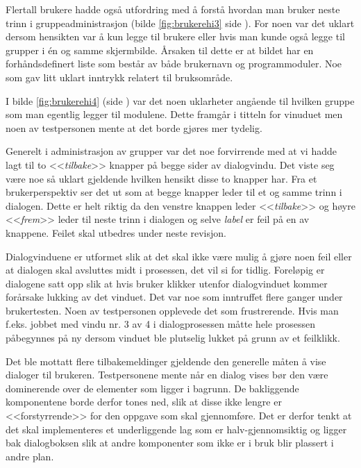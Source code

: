 Flertall brukere hadde også utfordring med å forstå hvordan man bruker neste trinn i gruppeadministrasjon (bilde \ref{fig:brukerehi3} side \pageref{fig:brukerehi3}). 
For noen var det uklart dersom hensikten var å kun legge til brukere eller hvis man kunde også legge til grupper i én og samme skjermbilde.
Årsaken til dette er at bildet har en forhåndsdefinert liste som består av både brukernavn og programmoduler. Noe som gav litt uklart inntrykk relatert til bruksområde.

I bilde \ref{fig:brukerehi4} (side \pageref{fig:brukerehi4}) var det noen uklarheter angående til hvilken gruppe som man egentlig legger til modulene. Dette framgår i titteln for vinuduet men noen av testpersonen mente at det borde gjøres mer tydelig. 

Generelt i administrasjon av grupper var det noe forvirrende med at vi hadde lagt til to <<\textit{tilbake}>> knapper på begge sider av dialogvindu. Det viste seg være noe så uklart gjeldende hvilken hensikt disse to knapper har. Fra et brukerperspektiv ser det ut som at begge knapper leder til et og samme trinn i dialogen. 
Dette er helt riktig da den venstre knappen leder <<\textit{tilbake}>> og høyre <<\textit{frem}>> leder til neste trinn i dialogen og selve \textit{label} er feil på en av knappene. Feilet skal utbedres under neste revisjon.

Dialogvinduene er utformet slik at det skal ikke være mulig å gjøre noen feil eller at dialogen skal avsluttes midt i prosessen, det vil si for tidlig.
Foreløpig er dialogene satt opp slik at hvis bruker klikker utenfor dialogvinduet kommer forårsake lukking av det vinduet. 
Det var noe som inntruffet flere ganger under brukertesten. 
Noen av testpersonen opplevede det som frustrerende. Hvis man f.eks. jobbet med vindu nr. 3 av 4 i dialogprosessen måtte hele prosessen påbegynnes på ny dersom vinduet ble plutselig lukket på grunn av et feilklikk. 

Det ble mottatt flere tilbakemeldinger gjeldende den generelle måten å vise dialoger til brukeren. Testpersonene mente når en dialog vises bør den være dominerende over de elementer som ligger i bagrunn.  
De bakliggende komponentene borde derfor tones ned, slik at disse ikke lengre er <<forstyrrende>> for den oppgave som skal gjennomføre.
Det er derfor tenkt at det skal implementeres et underliggende lag som er halv-gjennomsiktig og ligger bak dialogboksen slik at andre komponenter som ikke er i bruk blir plassert i andre plan.